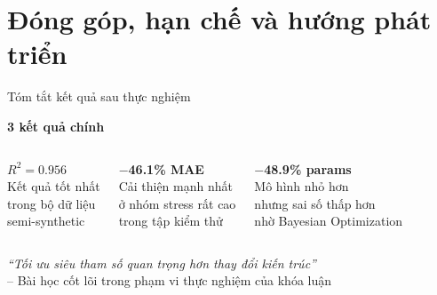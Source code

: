 \documentclass[11pt]{beamer}
\begin{document}
\section{Đóng góp, hạn chế và hướng phát triển}

\begin{frame}{Tóm tắt kết quả sau thực nghiệm}

\begin{center}
\Large\textbf{3 kết quả chính}
\end{center}

\vspace{0.2cm}

\begin{columns}[T]
\centering
\textbf{\textcolor{insightblue}{$R^2 = 0.956$}}\\[0.1cm]
\small Kết quả tốt nhất\\trong bộ dữ liệu\\semi-synthetic

\centering
\textbf{\textcolor{breakthroughgreen}{$-$46.1\% MAE}}\\[0.1cm]
\small Cải thiện mạnh nhất\\ở nhóm stress rất cao\\trong tập kiểm thử

\centering
\textbf{\textcolor{alertred}{$-$48.9\% params}}\\[0.1cm]
\small Mô hình nhỏ hơn\\nhưng sai số thấp hơn\\nhờ Bayesian Optimization
\end{columns}

\vspace{0.3cm}
\begin{center}
\small\textit{``Tối ưu siêu tham số quan trọng hơn thay đổi kiến trúc''}\\
\small -- Bài học cốt lõi trong phạm vi thực nghiệm của khóa luận
\end{center}
\end{frame}
\end{document}

